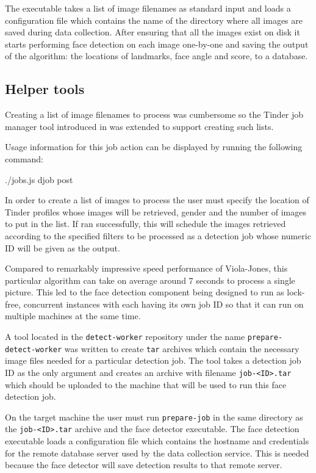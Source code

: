 The executable takes a list of image filenames as standard input and loads a
configuration file which contains the name of the directory where all images
are saved during data collection. After ensuring that all the images exist on
disk it starts performing face detection on each image one-by-one and saving
the output of the algorithm: the locations of landmarks, face angle and score,
to a database.

\subsection{Helper tools}
Creating a list of image filenames to process was cumbersome so the Tinder job
manager tool introduced in  was extended to support
creating such lists. 

Usage information for this job action can be displayed by running the following
command:
\begin{logs}
./jobs.js djob post
\end{logs}

In order to create a list of images to process the user must specify the
location of Tinder profiles whose images will be retrieved, gender and the
number of images to put in the list. If ran successfully, this will schedule
the images retrieved according to the specified filters to be processed as a
detection job whose numeric ID will be given as the output.

Compared to remarkably impressive speed performance of Viola-Jones, this
particular algorithm can take on average around 7 seconds to process a single
picture. This led to the face detection component being designed to run as
lock-free, concurrent instances with each having its own job ID so that it can
run on multiple machines at the same time.

A tool located in the \texttt{detect-worker} repository under the name
\texttt{prepare-detect-worker} was written to create \texttt{tar} archives
which contain the necessary image files needed for a particular detection job.
The tool takes a detection job ID as the only argument and creates an archive
with filename \texttt{job-<ID>.tar} which should be uploaded to the machine
that will be used to run this face detection job.

On the target machine the user must run \texttt{prepare-job} in the same
directory as the \texttt{job-<ID>.tar} archive and the face detector
executable. The face detection executable loads a configuration file which
contains the hostname and credentials for the remote database server used by
the data collection service. This is needed because the face detector will save
detection results to that remote server.


